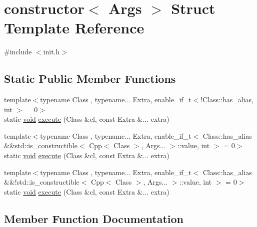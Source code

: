 \hypertarget{structconstructor}{}\section{constructor$<$ Args $>$ Struct Template Reference}
\label{structconstructor}


{\ttfamily \#include $<$init.\+h$>$}

\subsection*{Static Public Member Functions}
\begin{DoxyCompactItemize}
\item 
{\footnotesize template$<$typename Class , typename... Extra, enable\+\_\+if\+\_\+t$<$!\+Class\+::has\+\_\+alias, int $>$  = 0$>$ }\\static \mbox{\hyperlink{_s_d_l__opengles2__gl2ext_8h_ae5d8fa23ad07c48bb609509eae494c95}{void}} \mbox{\hyperlink{structconstructor_a18005e4a1a32b55cbccf36071f3f62e8}{execute}} (Class \&cl, const Extra \&... extra)
\item 
{\footnotesize template$<$typename Class , typename... Extra, enable\+\_\+if\+\_\+t$<$ Class\+::has\+\_\+alias \&\&std\+::is\+\_\+constructible$<$ Cpp$<$ Class $>$, Args... $>$\+::value, int $>$  = 0$>$ }\\static \mbox{\hyperlink{_s_d_l__opengles2__gl2ext_8h_ae5d8fa23ad07c48bb609509eae494c95}{void}} \mbox{\hyperlink{structconstructor_a18005e4a1a32b55cbccf36071f3f62e8}{execute}} (Class \&cl, const Extra \&... extra)
\item 
{\footnotesize template$<$typename Class , typename... Extra, enable\+\_\+if\+\_\+t$<$ Class\+::has\+\_\+alias \&\&!std\+::is\+\_\+constructible$<$ Cpp$<$ Class $>$, Args... $>$\+::value, int $>$  = 0$>$ }\\static \mbox{\hyperlink{_s_d_l__opengles2__gl2ext_8h_ae5d8fa23ad07c48bb609509eae494c95}{void}} \mbox{\hyperlink{structconstructor_a18005e4a1a32b55cbccf36071f3f62e8}{execute}} (Class \&cl, const Extra \&... extra)
\end{DoxyCompactItemize}


\subsection{Member Function Documentation}
\mbox{\label{structconstructor_a18005e4a1a32b55cbccf36071f3f62e8}} 
